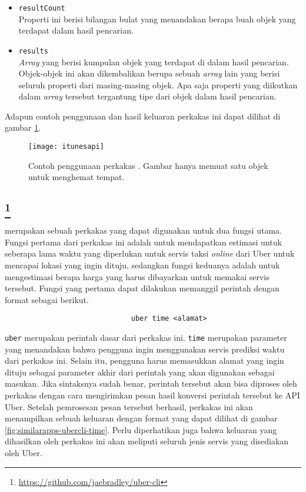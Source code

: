 \begin{itemize}
	\item \verb|resultCount|\\
	Properti ini berisi bilangan bulat yang menandakan berapa buah objek yang terdapat dalam hasil pencarian.
	\item \verb|results|\\
	\textit{Array} yang berisi kumpulan objek yang terdapat di dalam hasil pencarian. Objek-objek ini akan dikembalikan berupa sebuah \textit{array} lain yang berisi seluruh properti dari masing-masing objek. Apa saja properti yang diikutkan dalam \textit{array} tersebut tergantung tipe dari objek dalam hasil pencarian.
\end{itemize}
\vspace{\baselineskip}
Adapun contoh penggunaan dan hasil keluaran perkakas ini dapat dilihat di gambar \ref{fig:similarapps-itunesapi}.

\begin{figure}[ht]
    \centering
    \texttt{[image: itunesapi]}
    \caption[Contoh penggunaan perkakas \itunesapi]{Contoh penggunaan perkakas \itunesapi. Gambar hanya memuat satu objek untuk menghemat tempat.}
    \label{fig:similarapps-itunesapi}
\end{figure}

\subsection{\ubercli\footnote{\href{https://github.com/jaebradley/uber-cli}{https://github.com/jaebradley/uber-cli}}}
\label{sec:similarapps-ubercli}

\ubercli merupakan sebuah perkakas \cl yang dapat digunakan untuk dua fungsi utama. Fungsi pertama dari perkakas ini adalah untuk mendapatkan estimasi untuk seberapa lama waktu yang diperlukan untuk servis taksi \textit{online} dari Uber untuk mencapai lokasi yang ingin dituju, sedangkan fungsi keduanya adalah untuk mengestimasi berapa harga yang harus dibayarkan untuk memakai servis tersebut. 
\newline\newline\noindent
Fungsi yang pertama dapat dilakukan memanggil perintah dengan format sebagai berikut.

\begin{verbatim}
                              uber time <alamat>
\end{verbatim}

\verb|uber| merupakan perintah dasar dari perkakas ini. \verb|time| merupakan parameter yang menandakan bahwa pengguna ingin menggunakan servis prediksi waktu dari perkakas ini. Selain itu, pengguna harus memasukkan alamat yang ingin dituju sebagai parameter akhir dari perintah yang akan digunakan sebagai masukan. Jika sintaksnya sudah benar, perintah tersebut akan bisa diproses oleh perkakas dengan cara mengirimkan pesan hasil konversi perintah tersebut ke API Uber. Setelah pemrosesan pesan tersebut berhasil, perkakas ini akan menampilkan sebuah keluaran dengan format yang dapat dilihat di gambar \ref{fig:similarapps-ubercli-time}. Perlu diperhatikan juga bahwa keluaran yang dihasilkan oleh perkakas ini akan meliputi seluruh jenis servis yang disediakan oleh Uber.

